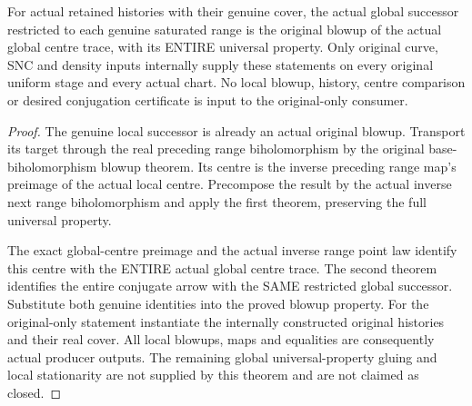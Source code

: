 \begin{theorem}
\label{hir:sharp-actual-curve-successor-local-blowup}
\leanok
For actual retained histories with their genuine cover, the actual global
successor restricted to each genuine saturated range is the original
blowup of the actual global centre trace, with its ENTIRE universal
property. Only original curve, SNC and density inputs internally supply
these statements on every original uniform stage and every actual chart.
No local blowup, history, centre comparison or desired conjugation
certificate is input to the original-only consumer.
\end{theorem}
\begin{proof}
The genuine local successor is already an actual original blowup.
Transport its target through the real preceding range biholomorphism by
the original base-biholomorphism blowup theorem. Its centre is the inverse
preceding range map's preimage of the actual local centre. Precompose the
result by the actual inverse next range biholomorphism and apply the first
theorem, preserving the full universal property.

The exact global-centre preimage and the actual inverse range point law
identify this centre with the ENTIRE actual global centre trace. The
second theorem identifies the entire conjugate arrow with the SAME
restricted global successor. Substitute both genuine identities into the
proved blowup property. For the original-only statement instantiate the
internally constructed original histories and their real cover. All local
blowups, maps and equalities are consequently actual producer outputs.
The remaining global universal-property gluing and local stationarity are
not supplied by this theorem and are not claimed as closed.
\end{proof}
